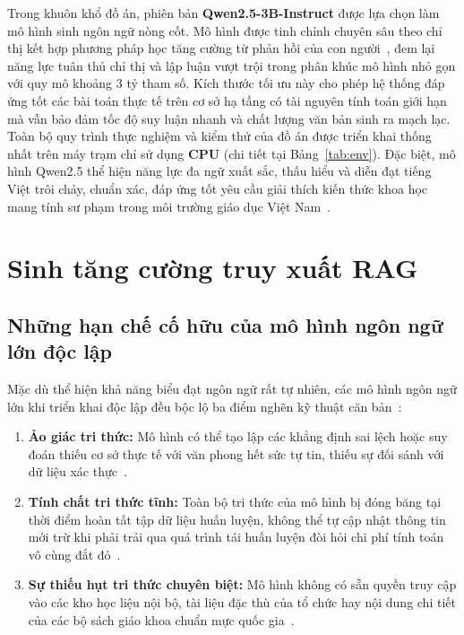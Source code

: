 Trong khuôn khổ đồ án, phiên bản \textbf{Qwen2.5-3B-Instruct} được lựa chọn làm mô hình sinh ngôn ngữ nòng cốt. Mô hình được tinh chỉnh chuyên sâu theo chỉ thị kết hợp phương pháp học tăng cường từ phản hồi của con người~\cite{ouyang2022instructgpt}, đem lại năng lực tuân thủ chỉ thị và lập luận vượt trội trong phân khúc mô hình nhỏ gọn với quy mô khoảng 3 tỷ tham số. Kích thước tối ưu này cho phép hệ thống đáp ứng tốt các bài toán thực tế trên cơ sở hạ tầng có tài nguyên tính toán giới hạn mà vẫn bảo đảm tốc độ suy luận nhanh và chất lượng văn bản sinh ra mạch lạc. Toàn bộ quy trình thực nghiệm và kiểm thử của đồ án được triển khai thống nhất trên máy trạm chỉ sử dụng \textbf{CPU} (chi tiết tại Bảng~\ref{tab:env}). Đặc biệt, mô hình Qwen2.5 thể hiện năng lực đa ngữ xuất sắc, thấu hiểu và diễn đạt tiếng Việt trôi chảy, chuẩn xác, đáp ứng tốt yêu cầu giải thích kiến thức khoa học mang tính sư phạm trong môi trường giáo dục Việt Nam~\cite{nguyen2020phobert}.

\section{Sinh tăng cường truy xuất RAG}
\subsection{Những hạn chế cố hữu của mô hình ngôn ngữ lớn độc lập}
Mặc dù thể hiện khả năng biểu đạt ngôn ngữ rất tự nhiên, các mô hình ngôn ngữ lớn khi triển khai độc lập đều bộc lộ ba điểm nghẽn kỹ thuật căn bản~\cite{gao2023ragsurvey}:
\begin{enumerate}
    \item \textbf{Ảo giác tri thức:} Mô hình có thể tạo lập các khẳng định sai lệch hoặc suy đoán thiếu cơ sở thực tế với văn phong hết sức tự tin, thiếu sự đối sánh với dữ liệu xác thực~\cite{ji2023hallucination, huang2023hallucination}.
    \item \textbf{Tính chất tri thức tĩnh:} Toàn bộ tri thức của mô hình bị đóng băng tại thời điểm hoàn tất tập dữ liệu huấn luyện, không thể tự cập nhật thông tin mới trừ khi phải trải qua quá trình tái huấn luyện đòi hỏi chi phí tính toán vô cùng đắt đỏ~\cite{lewis2020retrieval}.
    \item \textbf{Sự thiếu hụt tri thức chuyên biệt:} Mô hình không có sẵn quyền truy cập vào các kho học liệu nội bộ, tài liệu đặc thù của tổ chức hay nội dung chi tiết của các bộ sách giáo khoa chuẩn mực quốc gia~\cite{guu2020realm}.
\end{enumerate}

